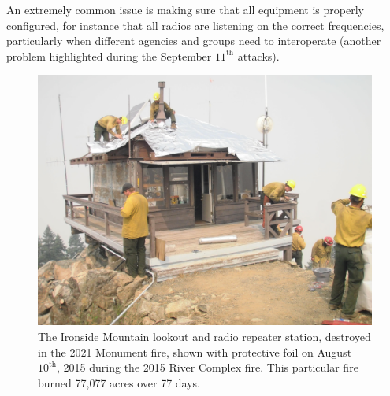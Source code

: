 \documentclass[]             %
{NASA}                       %
\theoremstyle{definition}
\begin{document}
An extremely common issue is making sure that all
equipment is properly configured, for instance that all radios are
listening on the correct frequencies, particularly when different
agencies and groups need to interoperate (another problem highlighted
during the September $11^\textrm{th}$ attacks).

\begin{figure}[t]
  \centering
  \includegraphics[scale=0.085]{images/ironside.jpg}
  \caption{The Ironside Mountain lookout and radio repeater station, destroyed in the 2021
    Monument fire, shown with protective foil on August
    $10^\textrm{th}$, 2015 during the 2015 River Complex fire. This
    particular fire burned 77,077 acres over 77 days. \citationneeded}
  \label{fig:ironside}
\end{figure}
\end{document}
